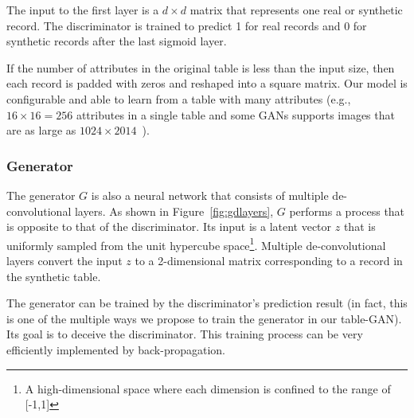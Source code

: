The input to the first layer is a $d \times d$ matrix that represents one real or synthetic record. The discriminator is trained to predict 1 for real records and 0 for synthetic records after the last sigmoid layer.

If the number of attributes in the original table is less than the input size, then each record is padded with zeros and reshaped into a square matrix. Our model is configurable and able to learn from a table with many attributes (e.g., $16 \times 16 = 256$ attributes in a single table and some GANs supports images that are as large as $1024 \times 2014$~\cite{2017arXiv171010196K}).



\subsubsection{Generator}
The generator $G$ is also a neural network that consists of multiple de-convolutional layers. As shown in Figure~\ref{fig:gdlayers}, $G$ performs a process that is opposite to that of the discriminator. Its input is a latent vector $z$ that is uniformly sampled from the unit hypercube space\footnote{A high-dimensional space where each dimension is confined to the range of [-1,1]}. Multiple de-convolutional layers convert the input $z$ to a 2-dimensional matrix corresponding to a record in the synthetic table.

The generator can be trained by the discriminator's prediction result (in fact, this is one of the multiple ways we propose to train the generator in our table-GAN). Its goal is to deceive the discriminator. This training process can be very efficiently implemented by back-propagation.

